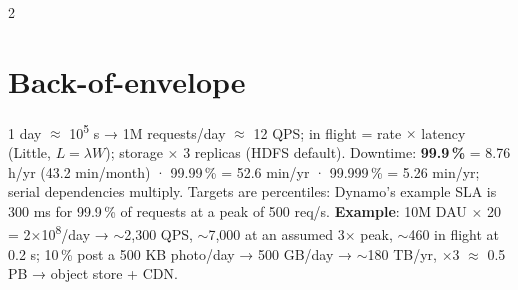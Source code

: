 \documentclass[8pt]{extarticle}
\begin{document}
\begin{multicols}{2}
\section{Back-of-envelope}
1 day $\approx$ 10\textsuperscript{5} s → 1M requests/day $\approx$ 12 QPS; in flight = rate $\times$
latency (Little, $L = \lambda W$); storage $\times$ 3 replicas (HDFS default). Downtime:
\textbf{99.9\,\%} = 8.76 h/yr (43.2 min/month) · 99.99\,\% = 52.6 min/yr · 99.999\,\% = 5.26 min/yr;
serial dependencies multiply. Targets are percentiles: Dynamo's example SLA is 300 ms for 99.9\,\%
of requests at a peak of 500 req/s. \textbf{Example}: 10M DAU $\times$ 20 =
2$\times$10\textsuperscript{8}/day → $\sim$2,300 QPS, $\sim$7,000 at an assumed 3$\times$ peak,
$\sim$460 in flight at 0.2 s; 10\,\% post a 500 KB photo/day → 500 GB/day → $\sim$180 TB/yr,
$\times$3 $\approx$ 0.5 PB → object store + CDN.

\columnbreak


\end{multicols}
\end{document}
